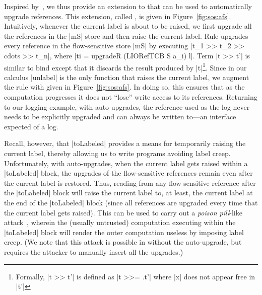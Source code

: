 Inspired by~\citep{Hedin13}, we thus provide an extension to \liofs{} that can
be used to automatically upgrade references.
%
This extension, called \lioafs{}, is given in Figure~\ref{fig:sos:afs}.
%
Intuitively, whenever the current label is about to be raised, we first upgrade
all the references in the |mS| store %
and then raise the current label.
%
Rule  upgrades every reference in the flow-sensitive store
|mS| by executing |t_1 >> t_2 >> cdots >> t_n|, where 
|ti = upgradeR (LIORefTCB S a_i) l|. Term |t >> t'| is
similar to bind except that it discards the result produced by
|t|\footnote{Formally, |t >> t'| is defined as |t >>= \x.t'| where |x| does not
  appear free in |t'|}. 
%
Since in our calculus |unlabel| is the only function that raises the current
label, we augment the  rule with  given in
Figure~\ref{fig:sos:afs}.
%
In doing so, this ensures that as the computation progresses it does not
``lose'' write access to its references.
%
Returning to our logging example, with auto-upgrades, the reference used as the
log never needs to be explicitly upgraded and can always be written to---an
interface expected of a log.

Recall, however, that |toLabeled| provides a means for temporarily raising the
current label, thereby allowing us to write programs avoiding 
label creep.
%
Unfortunately, with auto-upgrades, when the current label gets raised 
within a |toLabeled| block, the upgrades of the flow-sensitive references remain even
after the current label is restored.
%
Thus, reading from any flow-sensitive reference after the |toLabeled|
block will raise the current label to, at least, the current label at the end
of the |toLabeled| block (since all references are upgraded every time that 
the current label gets raised).
%
This can be used to carry out a \emph{poison pill}-like
attack~\cite{10.1109/SP.2013.10}, wherein the (usually untrusted) computation
executing within the |toLabeled| block will render the outer computation useless
by imposing label creep.
%
(We note that this attack is possible in \liofs{} without the auto-upgrade, but
requires the attacker to manually insert all the upgrades.)

